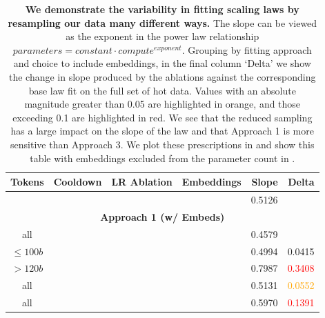 \documentclass{article}
\newcommand{\xmark}{\ding{55}} %
\newcommand{\cmark}{\ding{51}}
\begin{document}
\begin{table}[!t]
\centering
\caption{
\textbf{We demonstrate the variability in fitting scaling laws by resampling our data many different ways.}
The slope can be viewed as the exponent in the power law relationship $parameters = constant\cdot  compute ^{ exponent}$. Grouping by fitting approach and choice to include embeddings, in the final column `Delta' we show the change in slope produced by the ablations against the corresponding base law fit on the full set of hot data. 
Values with an absolute magnitude greater than 0.05 are highlighted in orange, and those exceeding 0.1 are highlighted in red. We see that the reduced sampling has a large impact on the slope of the law and that Approach 1 is more sensitive than Approach 3.
We plot these prescriptions in  and show this table with embeddings excluded from the parameter count in . 
}
\label{tab:rainbow-table}
\small
\vspace{4pt}
\begin{tabular}{ccccrr}
\toprule
Tokens & Cooldown & LR Ablation & Embeddings & Slope & Delta \\
\midrule
\citet{hoffmann2022empirical} & & & & 0.5126 &  \\
\midrule\multicolumn{6}{c}{\textbf{Approach 1 (w/ Embeds)}} \\
all & \xmark & \xmark & \cmark & 0.4579 &  \\
$\le 100b$ & \xmark & \xmark & \cmark & 0.4994 & 0.0415 \\
$>120b$ & \xmark & \xmark & \cmark & 0.7987 & \textcolor{red}{0.3408} \\
all & \xmark & \cmark & \cmark & 0.5131 & \textcolor{orange}{0.0552} \\
all & \cmark & \xmark & \cmark & 0.5970 & \textcolor{red}{0.1391} \\

\end{tabular}
\end{table}
\end{document}
